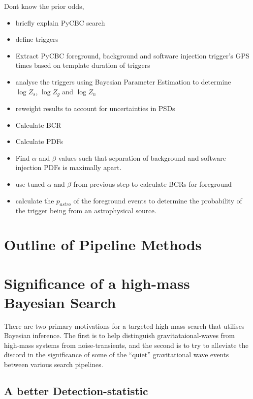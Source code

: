 \documentclass[%
 reprint,
 amsmath,amssymb,
 aps,
]{revtex4}
\begin{document}
Dont know the prior odds, 



\begin{itemize}
	\item briefly explain PyCBC search
	\item define triggers
	\item Extract PyCBC foreground, background and software injection trigger's GPS times based on template duration of triggers
	\item analyse the triggers using Bayesian Parameter Estimation to determine $\log{Z_s}$, $\log{Z_g}$ and $\log{Z_n}$
	\item reweight results to account for uncertainties in PSDs
	\item Calculate BCR
	\item Calculate PDFs
	\item Find $\alpha$ and $\beta$ values such that separation of background and software injection PDFs is maximally apart.
	\item use tuned $\alpha$ and $\beta$ from previous step to calculate BCRs for foreground
	\item calculate the $p_{astro}$ of the foreground events to determine the probability of the trigger being from an astrophysical source. 
\end{itemize}


\section{\label{sec:OutlineOfPipelineMethods}Outline of Pipeline Methods}



\section{Significance of a high-mass Bayesian Search}\label{significance}

There are two primary motivations for a targeted high-mass search that utilises Bayesian inference. The first is to help
distinguish gravitataional-waves from high-mass systems from noise-transients, and the second is to try to alleviate the
discord in the significance of some of the ``quiet'' gravitational wave events between various search pipelines.

\hypertarget{a-better-detection-statistic}{%
\subsection{A better Detection-statistic}\label{a-better-detection-statistic}}
\end{document}
